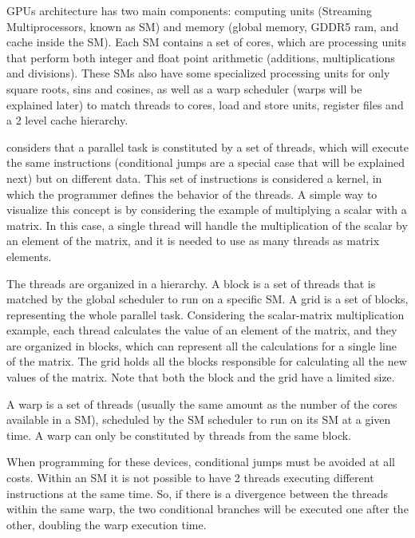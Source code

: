 \nvidia GPUs architecture has two main components: computing units (Streaming Multiprocessors, known as SM) and memory  (global memory, GDDR5 ram, and cache inside the SM). Each SM contains a set of \cuda cores, which are processing units that perform both integer and float point arithmetic (additions, multiplications and divisions). These SMs also have some specialized processing units for only square roots, sins and cosines, as well as a warp scheduler (warps will be explained later) to match \cuda threads to \cuda cores, load and store units, register files and a 2 level cache hierarchy.

\nvidia considers that a parallel task is constituted by a set of \cuda threads, which will execute the same instructions (conditional jumps are a special case that will be explained next) but on different data. This set of instructions is considered a \cuda kernel, in which the programmer defines the behavior of the \cuda threads. A simple way to visualize this concept is by considering the example of multiplying a scalar with a matrix. In this case, a single thread will handle the multiplication of the scalar by an element of the matrix, and it is needed to use as many \cuda threads as matrix elements.

The \cuda threads are organized in a hierarchy. A block is a set of \cuda threads that is matched by the global scheduler to run on a specific SM. A grid is a set of blocks, representing the whole parallel task. Considering the scalar-matrix multiplication example, each \cuda thread calculates the value of an element of the matrix, and they are organized in blocks, which can represent all the calculations for a single line of the matrix. The grid holds all the blocks responsible for calculating all the new values of the matrix. Note that both the block and the grid have a limited size.

A warp is a set of \cuda threads (usually the same amount as the number of the \cuda cores available in a SM), scheduled by the SM scheduler to run on its SM at a given time. A warp can only be constituted by \cuda threads from the same block.

When programming for these devices, conditional jumps must be avoided at all costs. Within an SM it is not possible to have 2 threads executing different instructions at the same time. So, if there is a divergence between the threads within the same warp, the two conditional branches will be executed one after the other, doubling the warp execution time.

